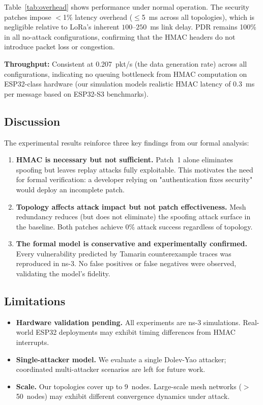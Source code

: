 \documentclass[journal]{IEEEtran}
\begin{document}
Table~\ref{tab:overhead} shows performance under normal operation.
The security patches impose $<$1\% latency overhead ($\le$5~ms across
all topologies), which is negligible relative to LoRa's inherent
$100$–$250$~ms link delay. PDR remains 100\% in all no-attack
configurations, confirming that the HMAC headers do not introduce
packet loss or congestion.

\textbf{Throughput:} Consistent at 0.207~pkt/s (the data generation
rate) across all configurations, indicating no queuing bottleneck
from HMAC computation on ESP32-class hardware (our simulation
models realistic HMAC latency of 0.3~ms per message based on
ESP32-S3 benchmarks).

\subsection{Discussion}

The experimental results reinforce three key findings from our formal
analysis:

\begin{enumerate}
  \item \textbf{HMAC is necessary but not sufficient.} Patch~1 alone
    eliminates spoofing but leaves replay attacks fully exploitable.
    This motivates the need for formal verification: a developer
    relying on "authentication fixes security" would deploy an
    incomplete patch.

  \item \textbf{Topology affects attack impact but not patch
    effectiveness.} Mesh redundancy reduces (but does not eliminate)
    the spoofing attack surface in the baseline. Both patches achieve
    0\% attack success regardless of topology.

  \item \textbf{The formal model is conservative and experimentally
    confirmed.} Every vulnerability predicted by Tamarin counterexample
    traces was reproduced in ns-3. No false positives or false
    negatives were observed, validating the model's fidelity.
\end{enumerate}

\subsection{Limitations}

\begin{itemize}
  \item \textbf{Hardware validation pending.} All experiments are
    ns-3 simulations. Real-world ESP32 deployments may exhibit
    timing differences from HMAC interrupts.

  \item \textbf{Single-attacker model.} We evaluate a single Dolev-Yao
    attacker; coordinated multi-attacker scenarios are left for future
    work.

  \item \textbf{Scale.} Our topologies cover up to 9~nodes. Large-scale
    mesh networks ($>$50~nodes) may exhibit different convergence
    dynamics under attack.
\end{itemize}
\end{document}
